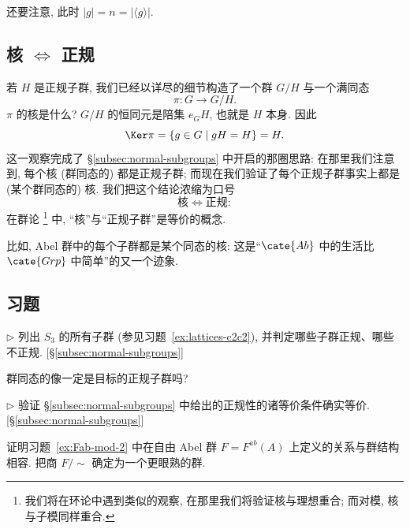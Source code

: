 还要注意, 此时 $|g| = n = |\langle g \rangle|$.

\subsection{核 \texorpdfstring{$\Longleftrightarrow$}{<=>} 正规}
\label{subsec:kernel-normal}

若 $H$ 是正规子群, 我们已经以详尽的细节构造了一个群 $G/H$ 与一个满同态
\[
\pi : G \to G/H.
\]
$\pi$ 的核是什么? $G/H$ 的恒同元是陪集 $e_G H$, 也就是 $H$ 本身. 因此
\[
\Ker \pi = \{g \in G \mid gH = H\} = H.
\]
这一观察完成了 \S\ref{subsec:normal-subgroups} 中开启的那圈思路: 在那里我们注意到, 每个核 (群同态的) 都是正规子群; 而现在我们验证了每个正规子群事实上都是 (某个群同态的) 核. 我们把这个结论浓缩为口号
\[
\text{核} \iff \text{正规}:
\]
在群论%
\footnote{我们将在环论中遇到类似的观察, 在那里我们将验证核与理想重合; 而对模, 核与子模同样重合.}%
中, ``核''与``正规子群''是等价的概念.

比如, Abel 群中的每个子群都是某个同态的核: 这是``$\cate{Ab}$ 中的生活比 $\cate{Grp}$ 中简单''的又一个迹象.

\subsection*{习题}
{}

\begin{prob}
\label{ex:subgroups-s3}
$\triangleright$ 列出 $S_3$ 的所有子群 (参见习题~\ref{ex:lattices-c2c2}), 并判定哪些子群正规、哪些不正规. [\S\ref{subsec:normal-subgroups}]
\end{prob}

\begin{prob}
\label{ex:image-normal}
群同态的像一定是目标的正规子群吗?
\end{prob}

\begin{prob}
\label{ex:normal-equiv}
$\triangleright$ 验证 \S\ref{subsec:normal-subgroups} 中给出的正规性的诸等价条件确实等价. [\S\ref{subsec:normal-subgroups}]
\end{prob}

\begin{prob}
\label{ex:fab-quotient}
证明习题~\ref{ex:Fab-mod-2} 中在自由 Abel 群 $F = F^{ab}(A)$ 上定义的关系与群结构相容. 把商 $F/{\sim}$ 确定为一个更眼熟的群.
\end{prob}

